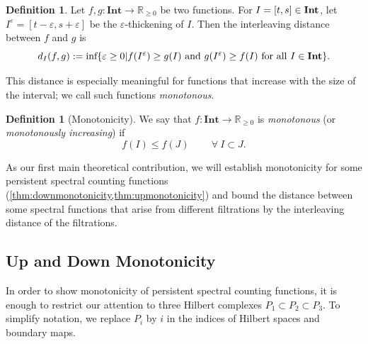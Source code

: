 \documentclass[11pt]{article}
\theoremstyle{definition}
\newtheorem{definition}[theorem]{Definition}
\theoremstyle{remark}
\newcommand{\R}{\mathbb{R}}
\begin{document}
\begin{definition}\textnormal{\citep[Function Interleaving Distance,][]{mww}} \label{defn:inteval}
     Let $f,g : \mathbf{Int} \to \mathbb{R}_{\geq 0}$ be two functions. For $I=[t,s] \in \text{\textbf{Int}}$, let $I^{\varepsilon} = [t-\varepsilon,s+\varepsilon]$ be the $\varepsilon$-thickening of $I$. Then the interleaving distance between $f$ and $g$ is 
     \[
     d_{I}(f,g) := \text{inf}\{\varepsilon \geq 0 \rvert f(I^{\varepsilon}) \geq g(I) \text{ and } g(I^{\varepsilon}) \geq f(I) \text{ for all } I \in \text{\textbf{Int}}\}.
     \]
\end{definition}

This distance is especially meaningful for functions that increase with the size of the interval; we call such functions \emph{monotonous}.

\begin{definition}[Monotonicity]
    We say that $f:\mathbf{Int} \rightarrow \R_{\ge 0}$ is \emph{monotonous} (or \emph{monotonously increasing}) if
    $$
    f(I) \le f(J) \qquad\ \forall\ I \subset J.
    $$
\end{definition}

As our first main theoretical contribution, we will establish monotonicity for some persistent spectral counting functions (\cref{thm:downmonotonicity,thm:upmonotonicity}) and bound the distance between some spectral functions that arise from different filtrations by the interleaving distance of the filtrations.

\subsection{Up and Down Monotonicity} \label{subsec:udmon}
In order to show monotonicity of persistent spectral counting functions, it is enough to restrict our attention to three Hilbert complexes $P_1 \subset P_2 \subset P_3$. To simplify notation, we replace $P_i$ by $i$ in the indices of Hilbert spaces and boundary maps. 
\end{document}
